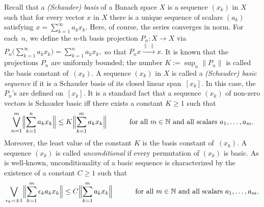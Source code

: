 \documentclass[12pt,leqno]{amsart}
\numberwithin{equation}{section}
\theoremstyle{definition}
\newcommand{\s}{\sum_{k=1}^\infty}
\newcommand{\norm}[1]{\lVert#1\rVert}
\newcommand{\Bignorm}[1]{\Bigl\lVert#1\Bigr\rVert}
\def\N{{\mathbb N}}
\begin{document}
Recall that a \emph{(Schauder) basis} of a Banach space $X$ is a sequence $(x_k)$ in $X$ such that  for
every vector $x$ in $X$ there is a unique sequence of scalars $(a_k)$ satisfying
$x=\s a_k x_k$. Here, of course, the series converges in norm.
For each~$n$,
we define the $n$-th basis projection $P_n\colon X\to X$ via
\begin{math}
  P_n\bigl(\s a_k x_k)=\sum_{k=1}^na_k x_k,
\end{math}
so that $P_nx\xrightarrow{\|\cdot\|}x.$
It is known that the projections $P_n$ are uniformly bounded; the number
$K:=\sup_n\norm{P_n}$ is called the basis constant of~$(x_k)$. A
sequence $(x_k)$ in $X$ is called a \emph{(Schauder) basic sequence}
if it is a Schauder basis of its closed linear span~$[x_k]$. In this case, the
$P_n$'s are defined on~$[x_k]$. It is a standard fact
that a sequence $(x_k)$ of non-zero vectors  is Schauder basic iff there
exists a constant $K\ge 1$ such that
\begin{equation}\label{reg basis in}
  \bigvee_{n=1}^m\Bignorm{\sum_{k=1}^na_kx_k}
  \le K\Bignorm{\sum_{k=1}^ma_kx_k}\hspace{1cm}\textrm{ for all $m\in\N$ and all scalars $a_1,\dots,a_m$.}
\end{equation}
Moreover, the least
value of the constant $K$ is the basis constant of~$(x_k)$.  A  sequence $(x_k)$ is called \emph{unconditional} if every permutation of $(x_k)$ is basic. As is well-known, unconditionality of a basic sequence is characterized by the existence of a constant $C\geq 1$ such that
\begin{equation}\label{reg basis unc}
  \bigvee_{\epsilon_k=\pm 1}\Bignorm{\sum_{k=1}^m \epsilon_ka_kx_k}
  \leq C\Bignorm{\sum_{k=1}^ma_kx_k}\hspace{1cm}\textrm{ for all $m\in\N$ and all scalars $a_1,\dots,a_m$.}
\end{equation}
\end{document}
